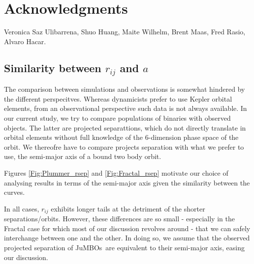\documentclass[submission,phys]{lib/SciPost}
\newcommand{\jumbos}{\mbox{JuMBOs}}
\begin{document}
\section*{Acknowledgments}
Veronica Saz Ulibarrena, Shuo Huang, Maite Wilhelm, Brent Maas,
Fred Rasio, Alvaro Hacar.


%

\begin{appendix}
  \section{Similarity between $r_{ij}$ and $a$}\label{Appendix:A}

  The comparison between simulations and observations is somewhat
  hindered by the different perspecitves. Whereas dynamicists prefer
  to use Kepler orbital elements, from an observational perspective
  such data is not always available. In our current study, we try to
  compare populations of binaries with observed objects. The latter
  are projected separattions, which do not directly translate in
  orbital elements without full knowledge of the 6-dimension phase
  space of the orbit. We thereofre have to compare projects separation
  with what we prefer to use, the semi-major axis of a bound two body
  orbit.

  Figures \ref{Fig:Plummer_rsep} and \ref{Fig:Fractal_rsep} motivate
  our choice of analysing results in terms of the semi-major axis
  given the similarity between the curves.
    
  In all cases, $r_{ij}$ exhibits longer tails at the detriment of the
  shorter separations/orbits. However, these differences are so small
  - especially in the Fractal case for which most of our discussion
  revolves around - that we can safely interchange between one and the
  other. In doing so, we assume that the observed projected separation
  of \jumbos\, are equivalent to their semi-major axis, easing our
  discussion.
    

\end{appendix}
\end{document}
